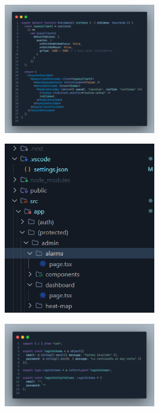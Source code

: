 \label{apendix:configuracion-aplicacion-web}
\begin{figure}[H]
    \centering
    \includegraphics[width=0.6\textwidth]{chapters/appendices/code/configuracion-aplicacion-web.png}
\end{figure}


\label{apendix:rutas-aplicacion-web}
\begin{figure}[H]
    \centering
    \includegraphics[width=0.6\textwidth]{chapters/appendices/code/rutas-aplicacion-web.png}
\end{figure}


\label{apendix:validacion-datos-web}
\begin{figure}[H]
    \centering
    \includegraphics[width=0.6\textwidth]{chapters/appendices/code/validacion-datos-web.png}
\end{figure}


